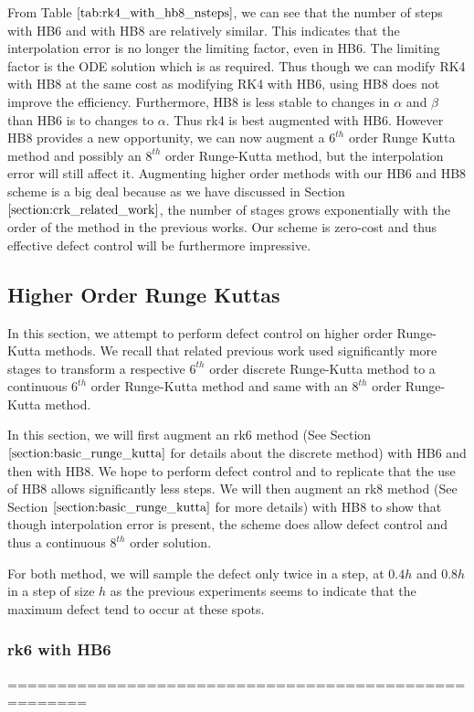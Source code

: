 \documentclass{article}
\begin{document}
From Table $\ref{tab:rk4_with_hb8_nsteps}$, we can see that the number of steps with HB6 and with HB8 are relatively similar. This indicates that the interpolation error is no longer the limiting factor, even in HB6. The limiting factor is the ODE solution which is as required. Thus though we can modify RK4 with HB8 at the same cost as modifying RK4 with HB6, using HB8 does not improve the efficiency. Furthermore, HB8 is less stable to changes in $\alpha$ and $\beta$ than HB6 is to changes to $\alpha$. Thus rk4 is best augmented with HB6. However HB8 provides a new opportunity, we can now augment a $6^{th}$ order Runge Kutta method and possibly an $8^{th}$ order Runge-Kutta method, but the interpolation error will still affect it. Augmenting higher order methods with our HB6 and HB8 scheme is a big deal because as we have discussed in Section $\ref{section:crk_related_work}$, the number of stages grows exponentially with the order of the method in the previous works. Our scheme is zero-cost and thus effective defect control will be furthermore impressive.


\subsection{Higher Order Runge Kuttas}
In this section, we attempt to perform defect control on higher order Runge-Kutta methods. We recall that related previous work used significantly more stages to transform a respective $6^{th}$ order discrete Runge-Kutta method to a continuous $6^{th}$ order Runge-Kutta method and same with an $8^{th}$ order Runge-Kutta method.

In this section, we will first augment an rk6 method (See Section $\ref{section:basic_runge_kutta}$ for details about the discrete method) with HB6 and then with HB8. We hope to perform defect control and to replicate that the use of HB8 allows significantly less steps. We will then augment an rk8 method (See Section $\ref{section:basic_runge_kutta}$ for more details) with HB8 to show that though interpolation error is present, the scheme does allow defect control and thus a continuous $8^{th}$ order solution. 

For both method, we will sample the defect only twice in a step, at $0.4h$ and $0.8h$ in a step of size $h$ as the previous experiments seems to indicate that the maximum defect tend to occur at these spots.

\subsubsection{rk6 with HB6}
======================================================
\end{document}
